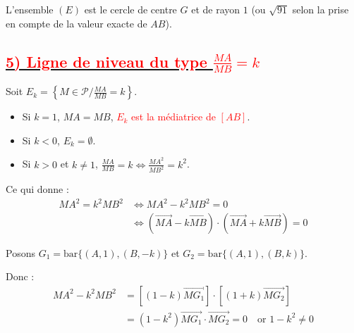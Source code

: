 \documentclass[12pt,a4paper]{article}
\begin{document}
L'ensemble $(E)$ est le cercle de centre $G$ et de rayon $1$ (ou $\sqrt{91}$ selon la prise en compte de la valeur exacte de $AB$).

\vspace{0.5cm}

\begin{center}
\end{center}

\subsection*{\underline{\textbf{\textcolor{red}{5) Ligne de niveau du type $\frac{MA}{MB} = k$}}}}

Soit $E_k = \left\{ M \in \mathcal{P} \big/ \frac{MA}{MB} = k \right\}$.

\begin{itemize}
    \item Si $k = 1$, $MA = MB$, \textcolor{red}{$E_k$ est la médiatrice de $[AB]$}.
    \item Si $k < 0$, $E_k = \emptyset$.
    \item Si $k > 0$ et $k \neq 1$, $\frac{MA}{MB} = k \iff \frac{MA^2}{MB^2} = k^2$.
\end{itemize}

Ce qui donne :
\begin{align*}
MA^2 = k^2 MB^2 &\iff MA^2 - k^2 MB^2 = 0 \\
&\iff \left(\overrightarrow{MA} - k\overrightarrow{MB}\right) \cdot \left(\overrightarrow{MA} + k\overrightarrow{MB}\right) = 0
\end{align*}

Posons $G_1 = \text{bar}\{(A, 1), (B, -k)\}$ et $G_2 = \text{bar}\{(A, 1), (B, k)\}$.

Donc :
\begin{align*}
MA^2 - k^2 MB^2 &= \left[(1 - k)\overrightarrow{MG_1}\right] \cdot \left[(1 + k)\overrightarrow{MG_2}\right] \\
&= (1 - k^2)\overrightarrow{MG_1} \cdot \overrightarrow{MG_2} = 0 \quad \text{or } 1 - k^2 \neq 0
\end{align*}
\end{document}
